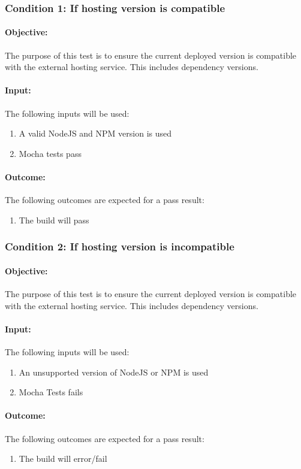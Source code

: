 \documentclass{article}
\begin{document}
\subsubsection{Condition 1: If hosting version is compatible}
\paragraph{Objective:} The purpose of this test is to ensure the current deployed version is compatible with the external hosting service. This includes dependency versions.
\paragraph{Input:} The following inputs will be used:
\begin{enumerate}
	\item A valid NodeJS and NPM version is used
	\item Mocha tests pass
\end{enumerate}
\paragraph{Outcome:} The following outcomes are expected for a pass result:
\begin{enumerate}
	\item The build will pass
\end{enumerate}
\subsubsection{Condition 2: If hosting version is incompatible}
\paragraph{Objective:} The purpose of this test is to ensure the current deployed version is compatible with the external hosting service. This includes dependency versions.
\paragraph{Input:} The following inputs will be used:
\begin{enumerate}
	\item An unsupported version of NodeJS or NPM is used
	\item Mocha Tests fails
\end{enumerate}
\paragraph{Outcome:} The following outcomes are expected for a pass result:
\begin{enumerate}
	\item The build will error/fail
\end{enumerate}
\end{document}
